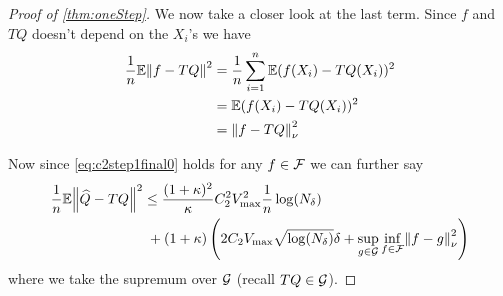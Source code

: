 \begin{proof}[Proof of \cref{thm:oneStep}]
  We now take a closer look at the last term. Since $f$ and $TQ$ doesn't
  depend on the $X_i$'s we have
  \begin{align*}
    \frac{1}{n} \mathbb{E} \norm{f- TQ}^2
    = & \; \frac{1}{n} \sum_{i=1}^n \mathbb{E} (f(X_i) - TQ(X_i))^2
    \\ = & \; \mathbb{E} (f(X_i) - TQ(X_i))^2
    \\ = & \; \norm{f - TQ}^2_\nu
  \end{align*}

  Now since \cref{eq:c2step1final0} holds
  for any $f \in \mathcal{F}$ we can further say
  \begin{align}
    \frac{1}{n} \mathbb{E} \norm{\widehat{Q} - TQ}^2
    & \leq \frac{(1+\kappa)^2}{\kappa} 
    C_2^2 V_{\max}^2 \frac{1}{n} \log(N_\delta)
    \notag
    \\ &\; + (1 + \kappa) \left(2 C_2 V_{\max} \sqrt{\log(N_\delta)} \delta
      + \sup_{g \in \mathcal{G}} \inf_{f \in \mathcal{F}}
    \norm{f - g}^2_\nu \right)
    \label{eq:c2step1final}
  \end{align}
  where we take the supremum over $\mathcal{G}$ (recall $TQ \in \mathcal{G}$).


\end{proof}
